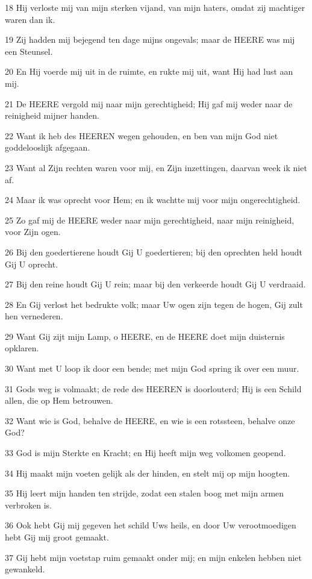 \par 18 Hij verloste mij van mijn sterken vijand, van mijn haters, omdat zij machtiger waren dan ik.
\par 19 Zij hadden mij bejegend ten dage mijns ongevals; maar de HEERE was mij een Steunsel.
\par 20 En Hij voerde mij uit in de ruimte, en rukte mij uit, want Hij had lust aan mij.
\par 21 De HEERE vergold mij naar mijn gerechtigheid; Hij gaf mij weder naar de reinigheid mijner handen.
\par 22 Want ik heb des HEEREN wegen gehouden, en ben van mijn God niet goddelooslijk afgegaan.
\par 23 Want al Zijn rechten waren voor mij, en Zijn inzettingen, daarvan week ik niet af.
\par 24 Maar ik was oprecht voor Hem; en ik wachtte mij voor mijn ongerechtigheid.
\par 25 Zo gaf mij de HEERE weder naar mijn gerechtigheid, naar mijn reinigheid, voor Zijn ogen.
\par 26 Bij den goedertierene houdt Gij U goedertieren; bij den oprechten held houdt Gij U oprecht.
\par 27 Bij den reine houdt Gij U rein; maar bij den verkeerde houdt Gij U verdraaid.
\par 28 En Gij verlost het bedrukte volk; maar Uw ogen zijn tegen de hogen, Gij zult hen vernederen.
\par 29 Want Gij zijt mijn Lamp, o HEERE, en de HEERE doet mijn duisternis opklaren.
\par 30 Want met U loop ik door een bende; met mijn God spring ik over een muur.
\par 31 Gods weg is volmaakt; de rede des HEEREN is doorlouterd; Hij is een Schild allen, die op Hem betrouwen.
\par 32 Want wie is God, behalve de HEERE, en wie is een rotssteen, behalve onze God?
\par 33 God is mijn Sterkte en Kracht; en Hij heeft mijn weg volkomen geopend.
\par 34 Hij maakt mijn voeten gelijk als der hinden, en stelt mij op mijn hoogten.
\par 35 Hij leert mijn handen ten strijde, zodat een stalen boog met mijn armen verbroken is.
\par 36 Ook hebt Gij mij gegeven het schild Uws heils, en door Uw verootmoedigen hebt Gij mij groot gemaakt.
\par 37 Gij hebt mijn voetstap ruim gemaakt onder mij; en mijn enkelen hebben niet gewankeld.
